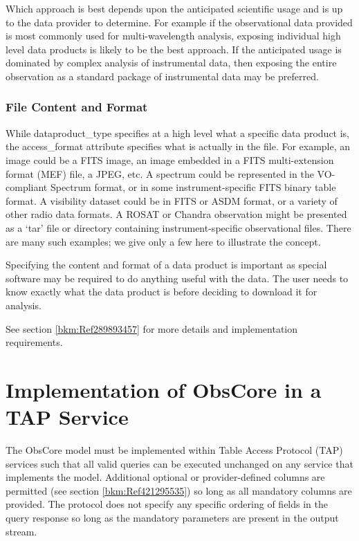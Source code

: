 \documentclass[11pt,a4paper]{ivoa}
\begin{document}
Which approach is best depends upon the anticipated scientific usage and is up to the data provider to determine.  For
example if the observational data provided is most commonly used for multi-wavelength analysis, exposing individual
high level data products is likely to be the best approach.  If the anticipated usage is dominated by complex analysis
of instrumental data, then exposing the entire observation as a standard package of instrumental data may be preferred.

\subsubsection{File Content and Format}
While dataproduct\_type specifies at a high level what a specific data product is, the access\_format attribute
specifies what is actually in the file.  For example, an {\textquotedbl}image{\textquotedbl} could be a FITS image, an
image embedded in a FITS multi-extension format (MEF) file, a JPEG, etc.  A {\textquotedbl}spectrum{\textquotedbl}
could be represented in the VO-compliant Spectrum format, or in some instrument-specific FITS binary table format.  A
visibility dataset could be in FITS or ASDM format, or a variety of other radio data formats.  A ROSAT or Chandra
observation might be presented as a `tar' file or directory containing instrument-specific observational files.  There
are many such examples; we give only a few here to illustrate the concept.

Specifying the content and format of a data product is important as special software may be required to do anything
useful with the data.  The user needs to know exactly what the data product is before deciding to download it for
analysis. 

See section \ref{bkm:Ref289893457} for more details and implementation requirements.

\section{Implementation of ObsCore in a TAP Service}
\label{bkm:Ref159237315}The ObsCore model must be implemented within Table Access Protocol (TAP) services such that all
valid queries can be executed unchanged on any service that implements the model.  Additional optional or
provider-defined columns are permitted (see section \ref{bkm:Ref421295535}) so long as all mandatory columns are
provided.  The protocol does not specify any specific ordering of fields in the query response so long as the mandatory
parameters are present in the output stream.
\end{document}
